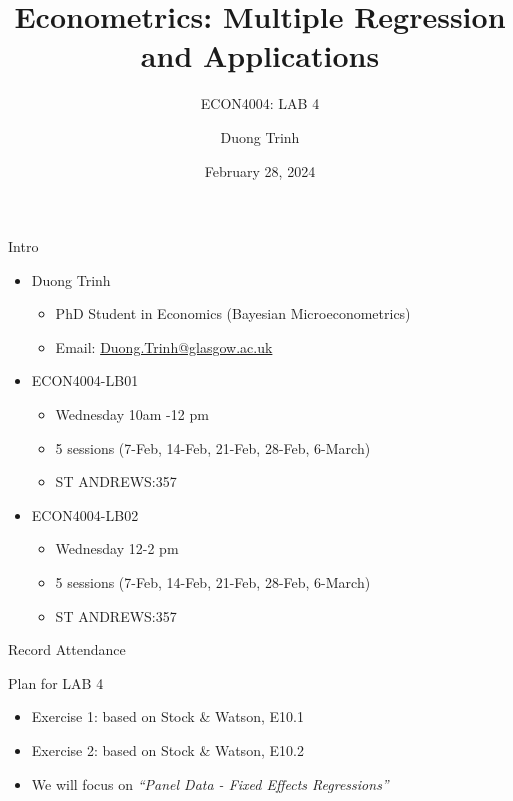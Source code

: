 \documentclass[
  10pt,
  ignorenonframetext,
]{beamer}
\title{Econometrics: Multiple Regression and Applications}
\subtitle{ECON4004: LAB 4}
\author{Duong Trinh}
\date{February 28, 2024}
\institute{University of Glasgow}
\providecommand{\tightlist}{%
  \setlength{\itemsep}{0pt}\setlength{\parskip}{0pt}}
\begin{document}
\frame{\titlepage}

\begin{frame}{Intro}
\protect\hypertarget{intro}{}
\begin{itemize}
\tightlist
\item
  Duong Trinh

  \begin{itemize}
  \tightlist
  \item
    PhD Student in Economics (Bayesian Microeconometrics)
  \item
    Email: \underline{Duong.Trinh@glasgow.ac.uk}
  \end{itemize}
\end{itemize}

\vspace{3mm}

\begin{itemize}
\tightlist
\item
  ECON4004-LB01

  \begin{itemize}
  \tightlist
  \item
    Wednesday 10am -12 pm
  \item
    5 sessions (7-Feb, 14-Feb, 21-Feb, 28-Feb, 6-March)
  \item
    ST ANDREWS:357
  \end{itemize}
\item
  ECON4004-LB02

  \begin{itemize}
  \tightlist
  \item
    Wednesday 12-2 pm
  \item
    5 sessions (7-Feb, 14-Feb, 21-Feb, 28-Feb, 6-March)
  \item
    ST ANDREWS:357
  \end{itemize}
\end{itemize}
\end{frame}

\begin{frame}{Record Attendance}
\protect\hypertarget{record-attendance}{}
\end{frame}

\begin{frame}{Plan for LAB 4}
\protect\hypertarget{plan-for-lab-4}{}
\begin{itemize}
\tightlist
\item
  Exercise 1: based on Stock \& Watson, E10.1
\item
  Exercise 2: based on Stock \& Watson, E10.2
\end{itemize}

\vspace{3mm}

\begin{itemize}
\tightlist
\item
  We will focus on \emph{``Panel Data - Fixed Effects Regressions''}
\end{itemize}
\end{frame}
\end{document}
